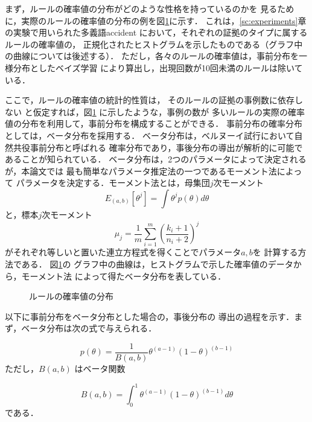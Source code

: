 まず，ルールの確率値の分布がどのような性格を持っているのかを
見るために，実際のルールの確率値の分布の例を図\ref{fig:distribution}に示す．
これは，\ref{sc:experiments}章の実験で用いられた多義語accident
において，それぞれの証拠のタイプに属するルールの確率値の，
正規化されたヒストグラムを示したものである（グラフ中の曲線については後述する）．
ただし，各々のルールの確率値は，事前分布を一様分布としたベイズ学習
により算出し，出現回数が10回未満のルールは除いている．

ここで，ルールの確率値の統計的性質は，
そのルールの証拠の事例数に依存しない
と仮定すれば，図\ref{fig:distribution} に示したような，事例の数が
多いルールの実際の確率値の分布を利用して，事前分布を構成することができる．
事前分布の確率分布としては，ベータ分布を採用する．
ベータ分布は，ベルヌーイ試行において自然共役事前分布と呼ばれる
確率分布であり，事後分布の導出が解析的に可能であることが知られている\cite{繁桝:ベイズ}．
ベータ分布は，2つのパラメータによって決定されるが，本論文では
最も簡単なパラメータ推定法の一つであるモーメント法によって
パラメータを決定する．モーメント法とは，母集団$j$次モーメント
\begin{equation}
E_{(a,b)}[\theta^j] = \int \theta^j p(\theta) d\theta
\end{equation}
と，標本$j$次モーメント
\begin{equation}
\mu_j = \frac{1}{m}\sum_{i=1}^m (\frac{k_i+1}{n_i+2})^j
\end{equation}
がそれぞれ等しいと置いた連立方程式を得くことでパラメータ$a,b$を
計算する方法である．
図\ref{fig:distribution}の
グラフ中の曲線は，ヒストグラムで示した確率値のデータから，モーメント法
によって得たベータ分布を表している．


\begin{figure}
\begin{center}
\end{center}
\caption{ルールの確率値の分布}
\label{fig:distribution}
\end{figure}

以下に事前分布をベータ分布とした場合の，事後分布の
導出の過程を示す．まず，ベータ分布は次の式で与えられる．

\begin{equation}
p(\theta) = \frac{1}{B(a, b)}\theta^{(a-1)}(1-\theta)^{(b-1)}
\end{equation}
ただし，$B(a, b)$ はベータ関数

\begin{equation}
B(a, b) =  \int_0^1 {\theta^{(a-1)}(1-\theta)^{(b-1)}} d\theta
\end{equation}
である．

